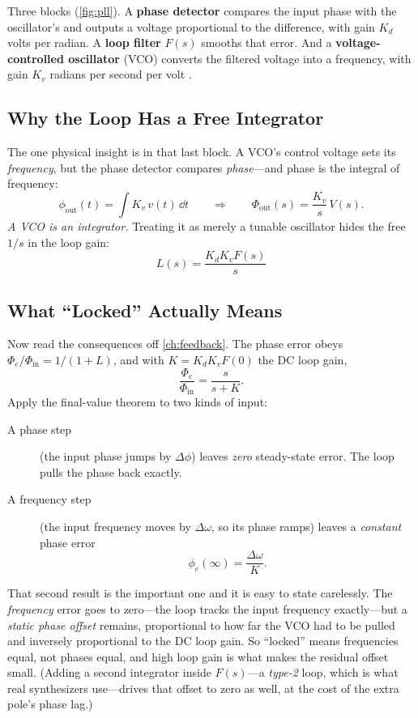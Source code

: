 Three blocks (\cref{fig:pll}). A \textbf{phase detector} compares the input phase with
the oscillator's and outputs a voltage proportional to the difference, with gain
\(K_d\) volts per radian. A \textbf{loop filter} \(F(s)\) smooths that error. And a
\textbf{voltage-controlled oscillator} (VCO) converts the filtered voltage into a
frequency, with gain \(K_v\) radians per second per volt
\cite[pp.~321--352]{davis2011rfcircuit}.

\subsection{Why the Loop Has a Free Integrator}
The one physical insight is in that last block. A VCO's control voltage sets its
\emph{frequency}, but the phase detector compares \emph{phase}---and phase is the
integral of frequency:
\[
\phi_{\mathrm{out}}(t)=\int K_v\,v(t)\,\dd t
\qquad\Longrightarrow\qquad
\Phi_{\mathrm{out}}(s)=\frac{K_v}{s}\,V(s).
\]
\emph{A VCO is an integrator.} Treating it as merely a tunable oscillator hides the
free \(1/s\) in the loop gain:
\[
\boxed{\;L(s)=\frac{K_dK_vF(s)}{s}\;}
\]

\subsection{What ``Locked'' Actually Means}
Now read the consequences off \cref{ch:feedback}. The phase error obeys
\(\Phi_e/\Phi_{\mathrm{in}}=1/(1+L)\), and with \(K=K_dK_vF(0)\) the DC loop gain,
\[
\frac{\Phi_e}{\Phi_{\mathrm{in}}}=\frac{s}{s+K}.
\]
Apply the final-value theorem to two kinds of input:
\begin{description}
\item[A phase step] (the input phase jumps by \(\Delta\phi\)) leaves \emph{zero}
steady-state error. The loop pulls the phase back exactly.
\item[A frequency step] (the input frequency moves by \(\Delta\omega\), so its phase
ramps) leaves a \emph{constant} phase error
\[
\phi_e(\infty)=\frac{\Delta\omega}{K}.
\]
\end{description}
That second result is the important one and it is easy to state carelessly. The
\emph{frequency} error goes to zero---the loop tracks the input frequency
exactly---but a \emph{static phase offset} remains, proportional to how far the VCO had
to be pulled and inversely proportional to the DC loop gain. So ``locked'' means
frequencies equal, not phases equal, and high loop gain is what makes the residual
offset small. (Adding a second integrator inside \(F(s)\)---a \emph{type-2} loop, which
is what real synthesizers use---drives that offset to zero as well, at the cost of the
extra pole's phase lag.)

